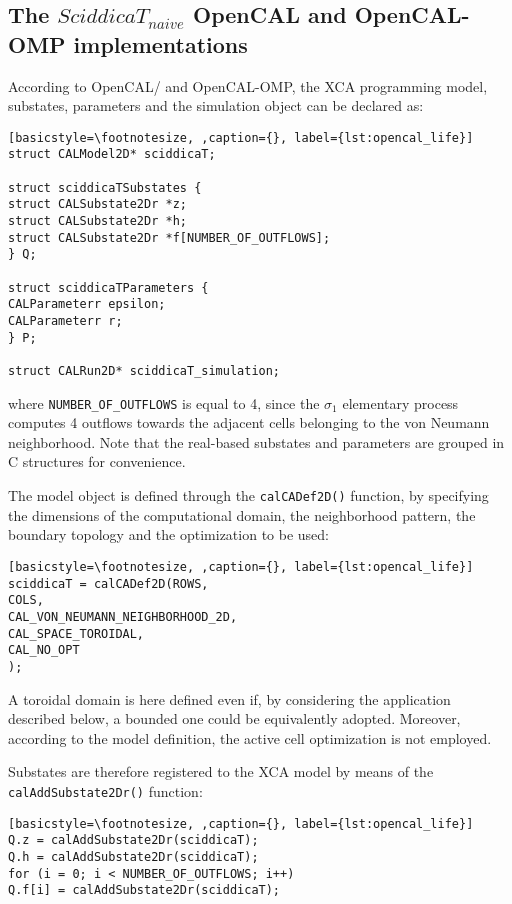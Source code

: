 \subsection{The $SciddicaT_{naive}$ OpenCAL and OpenCAL-OMP implementations}
According to OpenCAL/ and OpenCAL-OMP, the XCA programming model, substates,
parameters and the simulation object can be declared as:

\begin{lstlisting}[basicstyle=\footnotesize, ,caption={}, label={lst:opencal_life}]
struct CALModel2D* sciddicaT;

struct sciddicaTSubstates {
struct CALSubstate2Dr *z;
struct CALSubstate2Dr *h;
struct CALSubstate2Dr *f[NUMBER_OF_OUTFLOWS];
} Q;

struct sciddicaTParameters {
CALParameterr epsilon;
CALParameterr r;
} P;

struct CALRun2D* sciddicaT_simulation;
\end{lstlisting}

\noindent where \verb'NUMBER_OF_OUTFLOWS' is equal to 4, since the
$\sigma_1$ elementary process computes 4 outflows towards the
adjacent cells belonging to the von Neumann neighborhood. Note that
the real-based substates and parameters are grouped in C structures
for convenience.

The model object is defined through the \verb'calCADef2D()'
function, by specifying the dimensions of the computational domain,
the neighborhood pattern, the boundary topology and the optimization
to be used:

\begin{lstlisting}[basicstyle=\footnotesize, ,caption={}, label={lst:opencal_life}]
sciddicaT = calCADef2D(ROWS,
COLS,
CAL_VON_NEUMANN_NEIGHBORHOOD_2D,
CAL_SPACE_TOROIDAL,
CAL_NO_OPT
);
\end{lstlisting}

\noindent A toroidal domain is here defined even if, by considering
the application described below, a bounded one could be equivalently
adopted. Moreover, according to the model definition, the active
cell optimization is not employed.

Substates are therefore registered to the XCA model by means of the
\verb'calAddSubstate2Dr()' function:

\begin{lstlisting}[basicstyle=\footnotesize, ,caption={}, label={lst:opencal_life}]
Q.z = calAddSubstate2Dr(sciddicaT);
Q.h = calAddSubstate2Dr(sciddicaT);
for (i = 0; i < NUMBER_OF_OUTFLOWS; i++)
Q.f[i] = calAddSubstate2Dr(sciddicaT);
\end{lstlisting}


